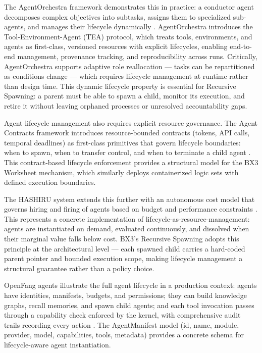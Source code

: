 The AgentOrchestra framework demonstrates this in practice: a conductor agent decomposes complex objectives into subtasks, assigns them to specialized sub-agents, and manages their lifecycle dynamically \cite{agentorchestra2025}. AgentOrchestra introduces the Tool-Environment-Agent (TEA) protocol, which treats tools, environments, and agents as first-class, versioned resources with explicit lifecycles, enabling end-to-end management, provenance tracking, and reproducibility across runs. Critically, AgentOrchestra supports adaptive role reallocation --- tasks can be repartitioned as conditions change --- which requires lifecycle management at runtime rather than design time. This dynamic lifecycle property is essential for Recursive Spawning: a parent must be able to spawn a child, monitor its execution, and retire it without leaving orphaned processes or unresolved accountability gaps.

Agent lifecycle management also requires explicit resource governance. The Agent Contracts framework introduces resource-bounded contracts (tokens, API calls, temporal deadlines) as first-class primitives that govern lifecycle boundaries: when to spawn, when to transfer control, and when to terminate a child agent \cite{agentcontracts2025}. This contract-based lifecycle enforcement provides a structural model for the BX3 Worksheet mechanism, which similarly deploys containerized logic sets with defined execution boundaries.

The HASHIRU system extends this further with an autonomous cost model that governs hiring and firing of agents based on budget and performance constraints \cite{hashiru2025}. This represents a concrete implementation of lifecycle-as-resource-management: agents are instantiated on demand, evaluated continuously, and dissolved when their marginal value falls below cost. BX3's Recursive Spawning adopts this principle at the architectural level --- each spawned child carries a hard-coded parent pointer and bounded execution scope, making lifecycle management a structural guarantee rather than a policy choice.

OpenFang agents illustrate the full agent lifecycle in a production context: agents have identities, manifests, budgets, and permissions; they can build knowledge graphs, recall memories, and spawn child agents; and each tool invocation passes through a capability check enforced by the kernel, with comprehensive audit trails recording every action \cite{openfang2025}. The AgentManifest model (id, name, module, provider, model, capabilities, tools, metadata) provides a concrete schema for lifecycle-aware agent instantiation.

